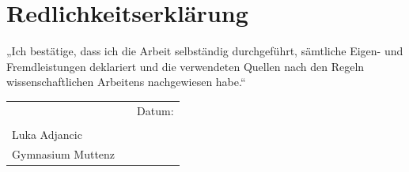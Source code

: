 \chapter{Redlichkeitserklärung}
\label{chap:Redlichkeitserklärung}

„Ich bestätige, dass ich die Arbeit selbständig durchgeführt, sämtliche Eigen- und Fremdleistungen deklariert und die verwendeten Quellen nach den Regeln wissenschaftlichen Arbeitens nachgewiesen habe.“  

\vspace{25mm}
\begin{tabular}{@{}p{2.5in}p{2in}p{2in}@{}}
\hrulefill && Datum:\\\\
Luka Adjancic &&\\
Gymnasium Muttenz
\end{tabular}